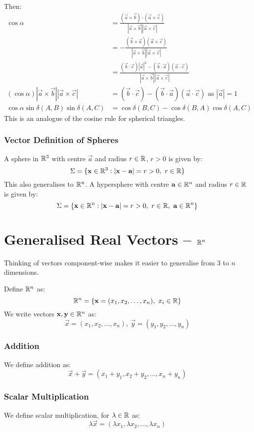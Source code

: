 \documentclass[../main.tex]{subfiles}
\begin{document}
Then:
\begin{align*}
  \cos \alpha &= \frac{(\vec{a} \times \vec{b}) \cdot (\vec{a} \times \vec{c})}{|\vec{a} \times \vec{b}| |\vec{a} \times \vec{c}|} \\
               &= - \frac{(\vec{b} \times \vec{a})(\vec{a} \times \vec{c})}{|\vec{a} \times \vec{b}||\vec{a} \times \vec{c}|} \\
               &= \frac{(\vec{b} \cdot \vec{c})|\vec{a}|^2 - (\vec{b} \cdot \vec{a})(\vec{a} \cdot \vec{c})}{|\vec{a} \times \vec{b}||\vec{a} \times \vec{c}|} \\
  (\cos \alpha)|\vec{a} \times \vec{b}||\vec{a} \times \vec{c}| &= (\vec{b} \cdot \vec{c}) - (\vec{b} \cdot \vec{a})(\vec{a} \cdot \vec{c}) \text{ as $|\vec{a}| = 1$} \\
  \cos \alpha \sin \delta(A, B) \sin \delta(A, C) &= \cos \delta(B, C) - \cos \delta(B, A) \cos \delta(A, C)
\end{align*}
This is an analogue of the cosine rule for spherical triangles.

\subsubsection{Vector Definition of Spheres}
A sphere in $\mathbb{R}^3$ with centre $\vec{a}$ and radius $r \in \mathbb{R}$, $r > 0$ is given by:
\[
  \Sigma=\{\boldsymbol{\mathbf{x}} \in \mathbb{R}^3 : |\boldsymbol{\mathbf{x}} - \boldsymbol{\mathbf{a}}| = r > 0,\ r \in \mathbb{R}\}
\]
This also generalises to $\mathbb{R}^{n}$.
A hypersphere with centre $\boldsymbol{\mathbf{a}} \in \mathbb{R}^{n}$ and radius $r \in \mathbb{R}$ is given by:
\[
  \Sigma =\{\boldsymbol{\mathbf{x}} \in \mathbb{R}^{n} : |\boldsymbol{\mathbf{x}} - \boldsymbol{\mathbf{a}}| = r > 0,\ r \in \mathbb{R},\ \boldsymbol{\mathbf{a}} \in \mathbb{R}^{n}\}
\]
\section{Generalised Real Vectors\texorpdfstring{ -- $\mathbb{R}^{n}$}{}}
\label{generalisedReal}
Thinking of vectors component-wise makes it easier to generalise from 3 to $n$ dimensions.

Define $\mathbb{R}^{n}$ as:
\[
  \R^{n} = \{\vec{x} = (x_1, x_2, \ldots, x_n),\ x_i \in \R\}
\]
We write vectors $\boldsymbol{\mathbf{x}}, \boldsymbol{\mathbf{y}} \in \mathbb{R}^{n}$ as:
\[
  \vec{x} = (x_1, x_2, \ldots, x_n),\ \vec{y} = (y_1, y_2, \ldots, y_n)
\]
\subsubsection{Addition}
We define addition as:
\[
  \vec{x} + \vec{y} = (x_1 + y_1, x_2 + y_2, \ldots, x_n + y_n)
\]
\subsubsection{Scalar Multiplication}
We define scalar multiplication, for $\lambda \in \mathbb{R}$ as:
\[
  \lambda \vec{x} = (\lambda x_1, \lambda x_2, \ldots, \lambda x_n)
\]
\end{document}
